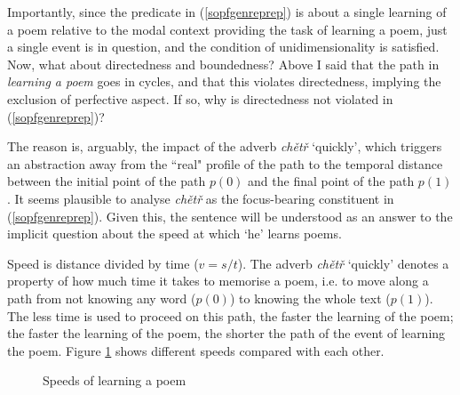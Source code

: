 \documentclass[output=paper,colorlinks,citecolor=brown]{langscibook}
\begin{document}
Importantly, since the predicate in (\ref{sopfgenreprep}) is about a single learning of a poem relative to the modal context providing 
the task of learning a poem, 
just a single event is in question, and the condition of unidimensionality is satisfied.
Now, what about directedness and boundedness? Above I said that the path in \textit{learning a poem} goes in cycles, and that this violates directedness, implying the exclusion of perfective aspect.
If so, why is directedness not violated in (\ref{sopfgenreprep})?

The reason is, arguably, the impact of the 
adverb \textit{chětř} `quickly', which triggers an abstraction away from the ``real" profile of the path to the temporal distance between the initial point of the path $p(0)$ and the final point of the path $p(1)$.
It seems plausible to analyse \textit{chětř} as the focus-bearing constituent in (\ref{sopfgenreprep}).
Given this, 
the sentence will be understood as an answer to the implicit question about the speed at which `he' learns poems. 

Speed is distance divided by time ($v=s/t$).
The adverb \textit{chětř} `quickly' denotes a property of how much time it takes to memorise a poem, i.e. to move along a path from not knowing any word ($p(0)$) to knowing the whole text ($p(1)$). The less time is used to proceed on this path, the faster the learning of the poem; the faster the learning of the poem, the shorter the path of the event of learning the poem.
Figure \ref{schnell} shows different speeds compared with each other. 

\begin{figure}
\caption{Speeds of learning a poem}
\label{schnell}
\end{figure}
\end{document}
